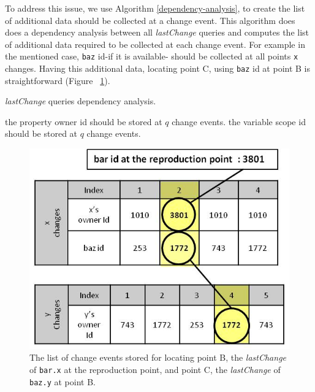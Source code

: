\documentclass[preprint]{sigplanconf}
\begin{document}
To address this issue, we use Algorithm \ref{dependency-analysis}, to
create the list of additional data should be collected at a change
event. This algorithm does does a dependency analysis between all
\textit{lastChange} queries and computes the list of additional data
required to be collected at each change event. For example in the
mentioned case, \texttt{baz} id-if it is available- should be
collected at all points \texttt{x} changes. Having this additional
data, locating point C, using \texttt{baz} id at point B is
straightforward (Figure ~\ref{fig:lastchange-lastchange}).

\begin{algorithm}
\caption{\textit{lastChange} queries dependency analysis.}
\label{dependency-analysis}
\begin{algorithmic}

     \STATE the property owner id should be stored at $q$ change events. 
     \STATE the variable scope id should be stored at $q$ change events.
	 \ENDIF 
 \ENDFOR 
\ENDFOR

\end{algorithmic}
\end{algorithm}

\begin{figure}[htp]
\includegraphics[width=.48\textwidth]{8-lastchange-lastchange.jpg}
\caption{The list of change events stored for locating point B, the
  \textit{lastChange} of \texttt{bar.x} at the reproduction point, and
  point C, the \textit{lastChange} of \texttt{baz.y} at point B.}
\label{fig:lastchange-lastchange}
\end{figure}



\end{document}
